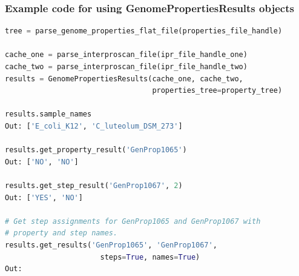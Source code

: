 \FloatBarrier
\subsubsection{Example code for using GenomePropertiesResults objects}

\begin{lstlisting}[language=Python]
tree = parse_genome_properties_flat_file(properties_file_handle)

cache_one = parse_interproscan_file(ipr_file_handle_one)
cache_two = parse_interproscan_file(ipr_file_handle_two)
results = GenomePropertiesResults(cache_one, cache_two, 
                                  properties_tree=property_tree)

results.sample_names
Out: ['E_coli_K12', 'C_luteolum_DSM_273']

results.get_property_result('GenProp1065')
Out: ['NO', 'NO']

results.get_step_result('GenProp1067', 2) 
Out: ['YES', 'NO']

# Get step assignments for GenProp1065 and GenProp1067 with 
# property and step names.
results.get_results('GenProp1065', 'GenProp1067', 
                      steps=True, names=True)
Out:
\end{lstlisting}

\begin{table}[!ht]
\centering
{}
\end{table}

